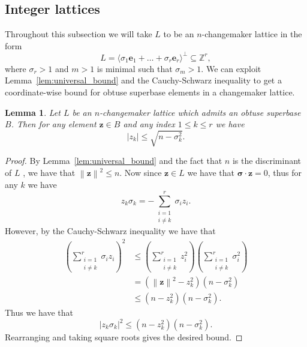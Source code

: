 \documentclass{amsart} %
\newcommand{\Z}{\mathbb{Z}}
\newcommand{\e}{\bm{e}}
\newcommand{\bsigma}{\bm{\sigma}}
\newcommand{\norm}[1]{\left\lVert #1 \right\rVert^2}
\theoremstyle{thm}
\newtheorem{lem}[Theorem]{Lemma}
\theoremstyle{definition}
\numberwithin{equation}{section}
\begin{document}
\subsection{Integer lattices}
Throughout this subsection we will take $L$ to be an $n$-change\-ma\-ker lattice in the form
\[
L=\langle \sigma_1 \e_1 + \dots + \sigma_r \e_r \rangle^\bot \subseteq \Z^r,
\]
where $\sigma_r>1$ and $m>1$ is minimal such that $\sigma_m>1$.
We can exploit Lemma~\ref{lem:universal_bound} and the Cauchy-Schwarz inequality to get a coordinate-wise bound for obtuse superbase elements in a changemaker lattice. 
\begin{lem}\label{lem:Cauchy_Schwarz_bound}
Let $L$ be an $n$-changemaker lattice which admits an obtuse superbase $B$. Then for any element $\bm{z}\in B$ and any index $1\leq k \leq r$ we have
\[
|z_k| \leq \sqrt{n-\sigma_k^2}.
\]
\end{lem}
\begin{proof}
By Lemma~\ref{lem:universal_bound} and the fact that $n$ is the discriminant of $L$ \cite[Lemma~3.10]{GreeneLRP}, we have that $\norm{\bm{z}}\leq n$.
Now since $\bm{z}\in L$ we have that $\bsigma\cdot \bm{z} =0$, thus for any $k$ we have
\[
z_k \sigma_k =-\sum_{\substack{i=1\\ i\neq k}}^r \sigma_i z_i.
\]
However, by the Cauchy-Schwarz inequality we have that
\begin{align*}
\left(\sum_{\substack{i=1\\ i\neq k}}^r \sigma_i z_i\right)^2 &\leq \left(\sum_{\substack{i=1\\ i\neq k}}^r z_i^2\right) \left(\sum_{\substack{i=1\\ i\neq k}}^r \sigma_i^2\right)\\
&=(\norm{\bm{z}}-z_k^2)(n-\sigma_k^2)\\
&\leq (n-z_k^2)(n-\sigma_k^2).
\end{align*}
Thus we have that
\[
|z_k \sigma_k|^2\leq (n-z_k^2)(n-\sigma_k^2).
\]
Rearranging and taking square roots gives the desired bound.
\end{proof}
\end{document}
